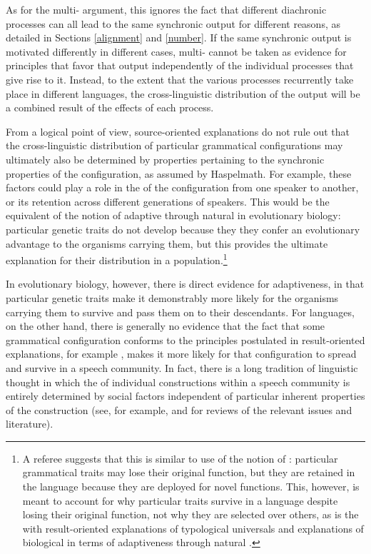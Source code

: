 \documentclass[output=paper]{langsci/langscibook}
\begin{document}
As for the multi- argument, this
ignores the fact that different
diachronic processes can all lead to the same synchronic output for
different reasons, as detailed in Sections \ref{alignment} and
\ref{number}. If the same synchronic output is motivated
differently in different cases, multi- cannot be taken as
evidence for principles that favor that output
independently of the individual processes that give rise to
it. Instead, to the extent that the various processes recurrently take place in
different languages, the cross-linguistic distribution of the output
will be a combined result of the effects of each process. 

From a logical point of view, source-oriented explanations do not rule
out that the cross-linguistic distribution of particular grammatical
configurations may ultimately also be determined by properties
pertaining to the synchronic properties of the configuration, as
assumed by Haspelmath. For example,  these factors could play a role in
the  of the configuration from one speaker to another, or
its retention across different generations of speakers. This would be
the equivalent of the notion of adaptive  through natural
 in evolutionary
biology: particular genetic traits do not develop because they
they confer an evolutionary advantage to the organisms
carrying them, but this provides the ultimate explanation for their
distribution in a population.\footnote{A referee suggests that this is
  similar to  use of the notion of
  : particular grammatical traits may lose their original
  function, but they are retained in the language because they are
  deployed for novel functions.  This, however, is meant to account for why
  particular traits  survive in a language despite losing their
  original function, not why they are
  selected over others, as is the  with  result-oriented
  explanations of typological universals and explanations of
  biological  in terms of adaptiveness through natural .}
  
\newpage
In evolutionary biology, however, there is direct evidence for
adaptiveness, in that particular genetic traits make it  demonstrably more likely for the organisms
carrying them to survive and pass them on to their
descendants. For languages, on the other hand, there is generally no evidence that the
fact that some grammatical configuration conforms to the principles
postulated in result-oriented explanations, for example , makes 
it more likely for that configuration to spread and survive in a
speech community. In fact, there is a long tradition of
linguistic thought in which the  of individual
constructions within  a speech community is entirely determined by
social factors independent of particular inherent properties of the
construction (see, for example, \citealt{McMahon1994}
and \citealt{BillLC} for reviews of the relevant issues and
literature). 
\end{document}
